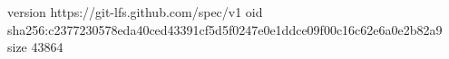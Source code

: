 version https://git-lfs.github.com/spec/v1
oid sha256:c2377230578eda40ced43391cf5d5f0247e0e1ddce09f00c16c62e6a0e2b82a9
size 43864
